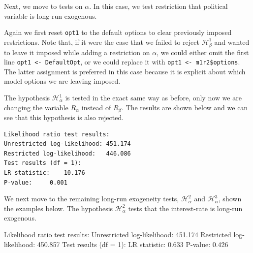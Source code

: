 \documentclass[article]{jss}
\begin{document}
Next, we move to tests on $\alpha$. 
In this case, we test restriction that political variable is long-run exogenous.


Again we first reset \verb|opt1| to the default options to clear previously imposed restrictions. Note that, if it were the case that we failed to reject $_{\beta}^1$ and wanted to leave it imposed while adding a restriction on $\alpha$, we could either omit the first line \verb|opt1 <- DefaultOpt|, or we could replace it with \verb|opt1 <- m1r2$options|. The latter assignment is preferred in this case because it is explicit about which model options we are leaving imposed.

The hypothesis $\mathscr{H}_{\alpha}^1$ is tested in the exact same way as before, only now we are changing the variable $R_{\alpha}$ instead of $R_{\beta}$. The results are shown below and we can see that this hypothesis is also rejected.

\begin{verbatim}
Likelihood ratio test results:
Unrestricted log-likelihood: 451.174
Restricted log-likelihood:   446.086
Test results (df = 1):
LR statistic: 	 10.176
P-value: 	 0.001
\end{verbatim}

We next move to the remaining long-run exogeneity tests, $\mathscr{H}_{\alpha}^2$ and $\mathscr{H}_{\alpha}^3$, shown
the examples below.
The hypothesis $\mathscr{H}_{\alpha}^2$ tests that the interest-rate is long-run exogenous.

\begin{CodeChunk} 
\begin{CodeOutput}
Likelihood ratio test results:
Unrestricted log-likelihood: 451.174
Restricted log-likelihood:   450.857
Test results (df = 1):
LR statistic: 	 0.633
P-value: 	 0.426
\end{CodeOutput}
\end{CodeChunk}  
\end{document}
